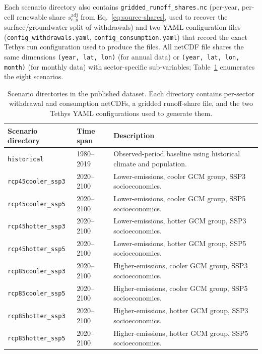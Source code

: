 \documentclass[fleqn,10pt]{wlscirep}
\begin{document}
Each scenario directory also contains \texttt{gridded\_runoff\_shares.nc} (per-year, per-cell renewable share $s^{\mathrm{adj}}_{c,y}$ from Eq.~\ref{eq:source-shares}, used to recover the surface/groundwater split of withdrawals) and two YAML configuration files (\texttt{config\_withdrawals.yaml}, \texttt{config\_consumption.yaml}) that record the exact Tethys run configuration used to produce the files. All netCDF file shares the same dimensions \texttt{(year, lat, lon)} (for annual data) or \texttt{(year, lat, lon, month)} (for monthly data) with sector-specific sub-variables; 
Table~\ref{tab:scenarios} enumerates the eight scenarios. 

\begin{table}[!ht]
\centering
\begin{tabular}{lll}
\toprule
\textbf{Scenario directory} & \textbf{Time span} & \textbf{Description} \\
\midrule
\texttt{historical}         & 1980--2019 & Observed-period baseline using historical climate and population. \\
\texttt{rcp45cooler\_ssp3}  & 2020--2100 & Lower-emissions, cooler GCM group, SSP3 socioeconomics. \\
\texttt{rcp45cooler\_ssp5}  & 2020--2100 & Lower-emissions, cooler GCM group, SSP5 socioeconomics. \\
\texttt{rcp45hotter\_ssp3}  & 2020--2100 & Lower-emissions, hotter GCM group, SSP3 socioeconomics. \\
\texttt{rcp45hotter\_ssp5}  & 2020--2100 & Lower-emissions, hotter GCM group, SSP5 socioeconomics. \\
\texttt{rcp85cooler\_ssp3}  & 2020--2100 & Higher-emissions, cooler GCM group, SSP3 socioeconomics. \\
\texttt{rcp85cooler\_ssp5}  & 2020--2100 & Higher-emissions, cooler GCM group, SSP5 socioeconomics. \\
\texttt{rcp85hotter\_ssp3}  & 2020--2100 & Higher-emissions, hotter GCM group, SSP3 socioeconomics. \\
\texttt{rcp85hotter\_ssp5}  & 2020--2100 & Higher-emissions, hotter GCM group, SSP5 socioeconomics. \\
\bottomrule
\end{tabular}
\caption{Scenario directories in the published dataset. Each directory contains per-sector withdrawal and consumption netCDFs, a gridded runoff-share file, and the two Tethys YAML configurations used to generate them.}
\label{tab:scenarios}
\end{table}
\end{document}
